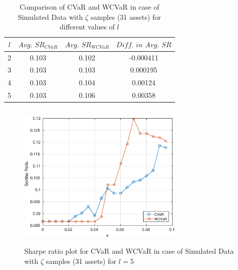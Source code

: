 \documentclass[12pt]{article}
\numberwithin{equation}{section}
\begin{document}
\begin{table}[!h]
    \centering
    \captionsetup{justification=centering}

   \begin{tabular}{||c|c|c|c||}
   \hline
  
$l$ & $Avg. \, \, SR_{CVaR}$ & $Avg. \, \, SR_{WCVaR}$ & $Diff. \, \, in \, \, Avg. \, \, SR$ \\
  
  \hline
2 & 0.103 & 0.102 & -0.000411 \\
3 & 0.103 & 0.103 & 0.000195 \\
4 & 0.103 & 0.104 & 0.00124 \\
5 & 0.103 & 0.106 & 0.00358 \\
  \hline
\end{tabular}
    \caption{Comparison of CVaR and WCVaR in case of Simulated Data with $\zeta$ samples (31 assets) for different values of $l$}
    \label{avgtab:6.2}
\end{table}

\begin{figure}[!h]
    \centering
   
    \includegraphics[height=7.0cm,width=0.7\textwidth]{CVaR/bse30_simulated/sr_exact_5.eps}

   \caption{Sharpe ratio plot for CVaR and WCVaR in case of Simulated Data with $\zeta$ samples (31 assets) for $l=5$}
   \label{fig:6.2}
\end{figure}
\end{document}
